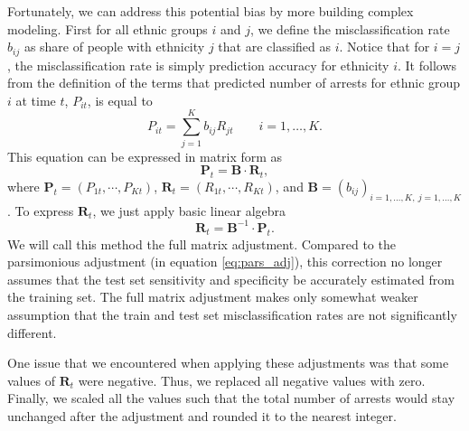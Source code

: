 Fortunately, we can address this potential bias by more building complex modeling.
First for all ethnic groups $i$ and $j$, we define the misclassification rate $b_{ij}$ as share of people with ethnicity $j$ that are classified as $i$.
Notice that for $i = j$, the misclassification rate is simply prediction accuracy for ethnicity $i$.
It follows from the definition of the terms that predicted number of arrests for ethnic group $i$ at time $t$,  $P_{it}$, is equal to 
\begin{equation}
P_{it}  = \sum_{j = 1}^{K} b_{ij} R_{jt} \qquad i = 1, \dots, K.
\end{equation}
This equation can be expressed in matrix form as
\begin{equation}
 \mathbf{P}_t = \mathbf{B} \cdot \mathbf{R}_t,
\end{equation}
where $\mathbf{P}_t = \left(P_{1t}, \cdots, P_{Kt} \right)$, $\mathbf{R}_t = \left(R_{1t}, \cdots, R_{Kt} \right)$, and $\mathbf{B} = \left(b_{ij}\right)_{i = 1, \dots, K,\:j = 1, \dots, K}$.
To express $\mathbf{R}_t$, we just  apply basic linear algebra
\begin{equation} \label{eq:full_matrix_adj}
\mathbf{R}_t  = \mathbf{B}^{-1} \cdot  \mathbf{P}_t.
\end{equation}
We will call this method the full matrix adjustment. Compared to the parsimonious adjustment (in equation \ref{eq:pars_adj}), this correction no longer assumes that the test set sensitivity and specificity be accurately estimated  from the training set.  The full matrix adjustment
makes only somewhat weaker assumption that the train and test set misclassification rates are not significantly different. 

One issue that we encountered when applying these adjustments was that some values of $\mathbf{R}_t$ were negative. Thus, we replaced all negative values with zero. Finally, we scaled all  the values such that the total number of arrests would stay unchanged after the adjustment and rounded it to the nearest integer. 





